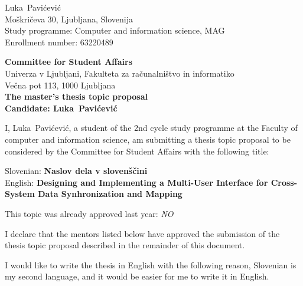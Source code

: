 \documentclass[a4paper, 12pt]{article}
\begin{document}
\newcommand{\ImeKandidata}{Luka} %
\newcommand{\PriimekKandidata}{Pavićević} %
\newcommand{\VpisnaStevilka}{63220489} %
\newcommand{\StudyProgramme}{Computer and information science, MAG} %
\newcommand{\NaslovBivalisca}{ Moškričeva 30, Ljubljana, Slovenija } %
\newcommand{\SLONaslov}{Naslov dela v slovenščini} %
\newcommand{\ENGNaslov}{Designing and Implementing a Multi-User Interface for Cross-System Data Synhronization and Mapping} %


\newcommand{\Kandidat}{\ImeKandidata~\PriimekKandidata}
\noindent
\Kandidat\\
\NaslovBivalisca \\
Study programme: \StudyProgramme \\
Enrollment number: \VpisnaStevilka
\bigskip

{\bf Committee for Student Affairs}\\
Univerza v Ljubljani, Fakulteta za računalništvo in informatiko\\
Večna pot 113, 1000 Ljubljana\\

{\Large\bf
{\centering
    The master’s thesis topic proposal \\%
\large Candidate: \Kandidat \\[10mm]}}


I, \Kandidat, a student of the 2nd cycle study programme at the Faculty of computer and information science, am submitting a thesis topic proposal to be considered by the Committee for Student Affairs with the following title:

Slovenian: {\bf \SLONaslov}\\
English: {\bf \ENGNaslov}

This topic was already approved last year: {\textit{NO}}
 

I declare that the mentors listed below have approved the submission of the thesis topic proposal described in the remainder of this document.

I would like to write the thesis in English with the following reason, Slovenian is my second language, and it would be easier for me to write it in English.
\end{document}
